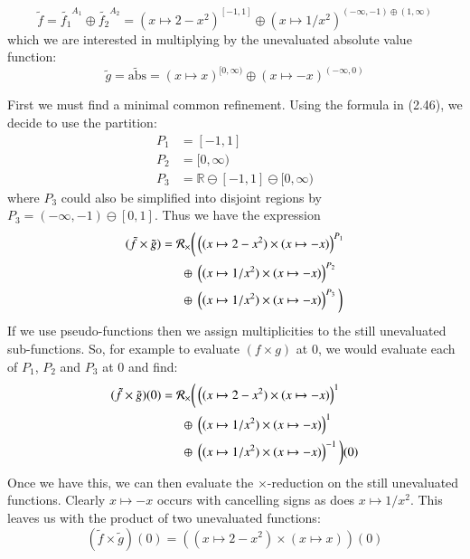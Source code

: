 \begin{equation}
	\tilde{f} = \tilde{f_1}^{A_1} \oplus \tilde{f_2}^{A_2} 
	  = (x \mapsto 2-x^2)^{[-1, 1]} \oplus (x \mapsto 1/x^2)^{(-\infty, -1) \oplus (1, \infty)}
\end{equation}
which we are interested in multiplying by the unevaluated absolute value function:
\begin{equation}
	\tilde{g} = \tilde{\text{abs}} = (x \mapsto x)^{[0, \infty )} \oplus (x \mapsto -x)^{(-\infty, 0)}
\end{equation}

First we must find a minimal common refinement.
Using the formula in (2.46), we decide to use the partition:
\begin{align}
	P_1 &= [-1,1] \\
	P_2 &= [0, \infty) \\
	P_3 &= \mathbb{R} \ominus [-1,1] \ominus [0, \infty)
\end{align}
where $P_3$ could also be simplified into disjoint regions by $P_3 = (-\infty, -1) \ominus [0,1]$.
Thus we have the expression
\begin{align}
	(\tilde{f} \times \tilde{g}) = \mathcal{R}_\times \bigg(
				& \left( (x \mapsto 2-x^2) \times (x \mapsto -x) \right)^{P_1} \notag \\
		\oplus \;& \left( (x \mapsto 1/x^2) \times (x \mapsto -x) \right)^{P_2} \notag \\
		\oplus \;& \left( (x \mapsto 1/x^2) \times (x \mapsto -x) \right)^{P_3} 
	\bigg)
\end{align}
If we use pseudo-functions then we assign multiplicities to the still unevaluated sub-functions.
So, for example to evaluate $(f \times g)$ at 0, we would evaluate each of $P_1$, $P_2$ and $P_3$ at 0 and find:
\begin{align}
	(\tilde{f} \times \tilde{g})(0) = \mathcal{R}_\times \bigg(
				& \left( (x \mapsto 2-x^2) \times (x \mapsto -x) \right)^1 \notag \\
		\oplus \;& \left( (x \mapsto 1/x^2) \times (x \mapsto -x) \right)^1 \notag \\
		\oplus \;& \left( (x \mapsto 1/x^2) \times (x \mapsto -x) \right)^{-1} 
	\bigg)(0)
\end{align}
Once we have this, we can then evaluate the $\times$-reduction on the still unevaluated functions.
Clearly $x \mapsto -x$ occurs with cancelling signs as does $x \mapsto 1/x^2$.
This leaves us with the product of two unevaluated functions:
\begin{equation}
	(\tilde{f} \times \tilde{g})(0) = \left((x \mapsto 2-x^2) \times (x \mapsto x)\right) (0)
\end{equation}


